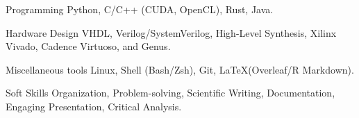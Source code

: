 

\begin{cvskills}

  \cvskill
    {Programming} %
    {Python, C/C++ (CUDA, OpenCL), Rust, Java.} %

  \cvskill
    {Hardware Design} %
    {VHDL, Verilog/SystemVerilog, High-Level Synthesis, Xilinx Vivado, Cadence Virtuoso, and Genus.} %
    
  \cvskill
    {Miscellaneous tools} %
    {Linux, Shell (Bash/Zsh), Git, \LaTeX (Overleaf/R Markdown).} %
    
  \cvskill
    {Soft Skills} %
    {Organization, Problem-solving, Scientific Writing, Documentation, Engaging Presentation, Critical Analysis.} %

\end{cvskills}
